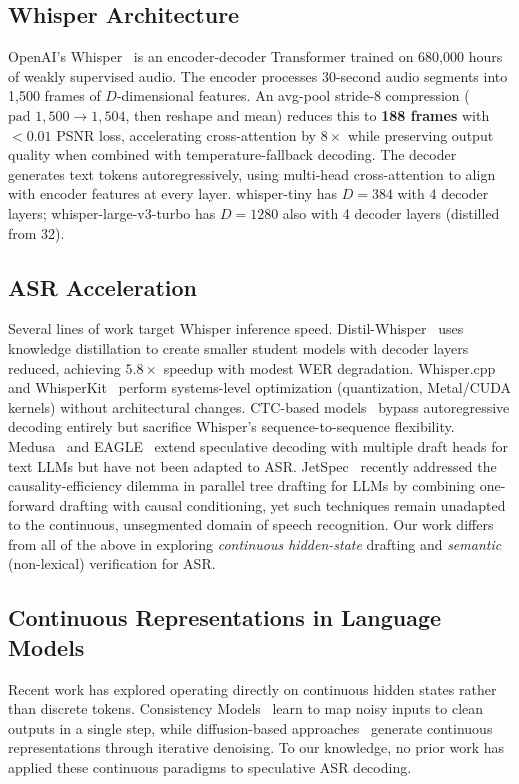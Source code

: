 \documentclass[11pt,a4paper]{article}
\begin{document}
\subsection{Whisper Architecture}
OpenAI's Whisper~\cite{radford2023whisper} is an encoder-decoder Transformer trained on 680,000 hours of weakly supervised audio.
The encoder processes 30-second audio segments into 1,500 frames of $D$-dimensional features. An avg-pool stride-8 compression ($\text{pad } 1{,}500 \to 1{,}504$, then reshape and mean) reduces this to \textbf{188 frames} with $<0.01$ PSNR loss, accelerating cross-attention by $8\times$ while preserving output quality when combined with temperature-fallback decoding.
The decoder generates text tokens autoregressively, using multi-head cross-attention to align with encoder features at every layer.
whisper-tiny has $D=384$ with 4 decoder layers; whisper-large-v3-turbo has $D=1280$ also with 4 decoder layers (distilled from 32).

\subsection{ASR Acceleration}
Several lines of work target Whisper inference speed.
Distil-Whisper~\cite{gandhi2023distilwhisper} uses knowledge distillation to create smaller student models with decoder layers reduced, achieving $5.8\times$ speedup with modest WER degradation.
Whisper.cpp~\cite{gerganov2023whispercpp} and WhisperKit~\cite{apple2024whisperkit} perform systems-level optimization (quantization, Metal/CUDA kernels) without architectural changes.
CTC-based models~\cite{graves2006ctc} bypass autoregressive decoding entirely but sacrifice Whisper's sequence-to-sequence flexibility.
Medusa~\cite{cai2024medusa} and EAGLE~\cite{li2024eagle} extend speculative decoding with multiple draft heads for text LLMs but have not been adapted to ASR.
JetSpec~\cite{hu2026jetspec} recently addressed the causality-efficiency dilemma in parallel tree drafting for LLMs by combining one-forward drafting with causal conditioning, yet such techniques remain unadapted to the continuous, unsegmented domain of speech recognition.
Our work differs from all of the above in exploring \emph{continuous hidden-state} drafting and \emph{semantic} (non-lexical) verification for ASR.

\subsection{Continuous Representations in Language Models}
Recent work has explored operating directly on continuous hidden states rather than discrete tokens.
Consistency Models~\cite{song2023consistency} learn to map noisy inputs to clean outputs in a single step, while diffusion-based approaches~\cite{ho2020denoising} generate continuous representations through iterative denoising.
To our knowledge, no prior work has applied these continuous paradigms to speculative ASR decoding.
\end{document}
